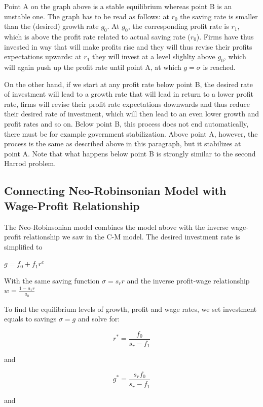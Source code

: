 \documentclass[
  letterpaper,
  DIV=11,
  numbers=noendperiod]{scrreprt}
\begin{document}
Point A on the graph above is a stable equilibrium whereas point B is an
unstable one. The graph has to be read as follows: at \(r_0\) the saving
rate is smaller than the (desired) growth rate \(g_0\). At \(g_0\), the
corresponding profit rate is \(r_1\), which is above the profit rate
related to actual saving rate (\(r_0\)). Firms have thus invested in way
that will make profits rise and they will thus revise their profits
expectations upwards: at \(r_1\) they will invest at a level slighlty
above \(g_0\), which will again push up the profit rate until point A,
at which \(g=\sigma\) is reached.

On the other hand, if we start at any profit rate below point B, the
desired rate of investment will lead to a growth rate that will lead in
return to a lower profit rate, firms will revise their profit rate
expectations downwards and thus reduce their desired rate of investment,
which will then lead to an even lower growth and profit rates and so on.
Below point B, this process does not end automatically, there must be
for example government stabilization. Above point A, however, the
process is the same as described above in this paragraph, but it
stabilizes at point A. Note that what happens below point B is strongly
similar to the second Harrod problem.

\hypertarget{connecting-neo-robinsonian-model-with-wage-profit-relationship}{%
\subsection{Connecting Neo-Robinsonian Model with Wage-Profit
Relationship}\label{connecting-neo-robinsonian-model-with-wage-profit-relationship}}

The Neo-Robinsonian model combines the model above with the inverse
wage-profit relationship we saw in the C-M model. The desired investment
rate is simplified to

\(g = f_0+f_1r^e\)

With the same saving function \(\sigma = s_rr\) and the inverse
profit-wage relationship \(w =\frac{1-a_1 r}{a_0}\)

To find the equilibrium levels of growth, profit and wage rates, we set
investment equals to savings \(\sigma = g\) and solve for:

\[r^* = \frac{f_0}{s_r-f_1}\]

and

\[g^*=\frac{s_rf_0}{s_r-f_1}\]

and
\end{document}
